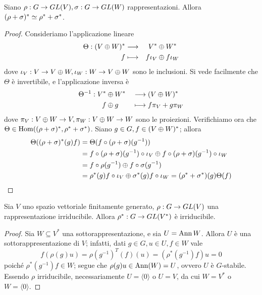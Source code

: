 \begin{proposition}
Siano $\rho:G\to GL(V),\allowbreak\sigma:G\to GL(W)$ rappresentazioni. Allora $(\rho+\sigma)^*\simeq\rho^*+\sigma^*$.
\end{proposition}
\begin{proof}
Consideriamo l'applicazione lineare
\begin{alignat*}{3}
\Theta:(V\oplus W)^*&\longrightarrow &V^*&\oplus W^*\\
f&\longmapsto &f\iota_V&\oplus f\iota_W
\end{alignat*}
dove $\iota_V:V\to V\oplus W,\allowbreak\iota_W:W\to V\oplus W$ sono le inclusioni. Si vede facilmente che $\Theta$ è invertibile, e l'applicazione inversa è
\begin{alignat*}{2}
\Theta^{-1}:V^*&\oplus W^*&&\longrightarrow(V\oplus W)^*\\
f&\oplus g&&\longmapsto f\pi_V+g\pi_W
\end{alignat*}
dove $\pi_V:V\oplus W\to V,\allowbreak\pi_W:V\oplus W\to W$ sono le proiezioni. Verifichiamo ora che $\Theta\in\operatorname{Hom}((\rho+\sigma)^*,\rho^*+\sigma^*)$. Siano $g\in G,f\in(V\oplus W)^*$; allora
\begin{align*}
\Theta((\rho+\sigma)^*(g)f)&=\Theta(f\circ(\rho+\sigma)(g^{-1}))\\
&=f\circ(\rho+\sigma)(g^{-1})\circ\iota_V\oplus f\circ(\rho+\sigma)(g^{-1})\circ\iota_W\\
&=f\circ\rho(g^{-1})\oplus f\circ\sigma(g^{-1})\\
&=\rho^*(g)f\circ\iota_V\oplus\sigma^*(g)f\circ\iota_W=(\rho^*+\sigma^*)(g)\Theta(f)
\end{align*}
\end{proof}

\begin{proposition}
Sia $V$ uno spazio vettoriale finitamente generato, $\rho:G\to GL(V)$ una rappresentazione irriducibile. Allora $\rho^*:G\to GL(V^*)$ è irriducibile.
\end{proposition}
\begin{proof}
Sia $W\subseteq V^*$ una sottorappresentazione, e sia $U=\operatorname{Ann} W$. Allora $U$ è una sottorappresentazione di $V$; infatti, dati $g\in G\comma u\in U\comma f\in W$ vale
$$
f(\rho(g)u)=\rho(g^{-1})^T(f)(u)=(\rho^*(g^{-1})f)u=0
$$
poiché $\rho^*(g^{-1})f\in W$; segue che $\rho(g)u\in\operatorname{Ann}(W)=U$, ovvero $U$ è $G$-stabile. Essendo $\rho$ irriducibile, necessariamente $U=\langle 0\rangle$ o $U=V$, da cui $W=V^*$ o $W=\langle 0\rangle$.
\end{proof}

